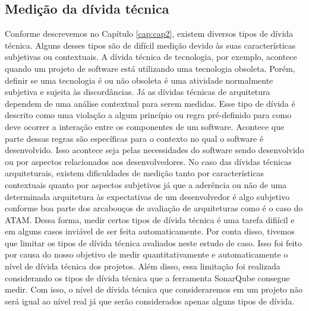 \subsection{Medição da dívida técnica}

Conforme descrevemos no Capítulo \ref{cap:cap2}, existem diversos tipos de dívida técnica. Alguns desses tipos são de difícil medição devido às suas características subjetivas ou contextuais. A dívida técnica de tecnologia, por exemplo, acontece quando um projeto de software está utilizando uma tecnologia obsoleta. Porém, definir se uma tecnologia é ou não obsoleta é uma atividade normalmente subjetiva e sujeita às discordâncias. Já as dívidas técnicas de arquitetura dependem de uma análise contextual para serem medidas.  Esse tipo de dívida é descrito como uma violação a algum princípio ou regra pré-definido para como deve ocorrer a interação entre os componentes de um software. Acontece que parte dessas regras são específicas para o contexto no qual o software é desenvolvido. Isso acontece seja pelas necessidades do software sendo desenvolvido ou por aspectos relacionados aos desenvolvedores. No caso das dívidas técnicas arquiteturais, existem dificuldades de medição tanto por características contextuais quanto por aspectos subjetivos já que a aderência ou não de uma determinada arquitetura às expectativas de um desenvolvedor é algo subjetivo conforme boa parte dos arcabouços de avaliação de arquiteturas como é o caso do ATAM\cite{kazman2000atam}. Dessa forma, medir certos tipos de dívida técnica é uma tarefa difiícil e em alguns casos inviável de ser feita automaticamente. Por conta disso,  tivemos que limitar os tipos de dívida técnica avaliados neste estudo de caso. Isso foi feito por causa do nosso objetivo de medir quantitativamente e automaticamente o nível de dívida técnica dos projetos. Além disso, essa limitação foi realizada considerando os tipos de dívida técnica que a ferramenta SonarQube consegue medir. Com isso, o nível de dívida técnica que consideraremos em um projeto não será igual ao nível real já que serão considerados apenas alguns tipos de dívida.

